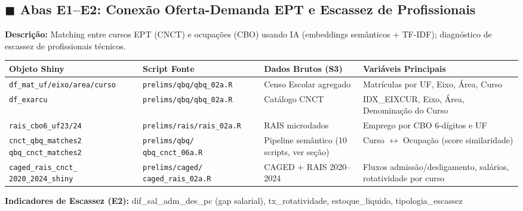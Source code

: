 \documentclass[10pt]{article}
\begin{document}
	\subsection*{\textcolor{tabE}{$\blacksquare$} Abas E1--E2: Conexão Oferta-Demanda EPT e Escassez de Profissionais}
	
	\noindent\textbf{Descrição:} Matching entre cursos EPT (CNCT) e ocupações (CBO) usando IA (embeddings semânticos + TF-IDF); diagnóstico de escassez de profissionais técnicos.
	
	\begin{center}
		\small
		\begin{tabular}{p{3.5cm}p{4.5cm}p{5cm}p{9cm}}
			\toprule
			\textbf{Objeto Shiny} & \textbf{Script Fonte} & \textbf{Dados Brutos (S3)} & \textbf{Variáveis Principais} \\
			\midrule
			\texttt{df\_mat\_uf/eixo/area/curso} & \texttt{prelims/qbq/qbq\_02a.R} & Censo Escolar agregado & Matrículas por UF, Eixo, Área, Curso \\
			\texttt{df\_exarcu} & \texttt{prelims/qbq/qbq\_02a.R} & Catálogo CNCT & IDX\_EIXCUR, Eixo, Área, Denominação do Curso \\
			\texttt{rais\_cbo6\_uf23/24} & \texttt{prelims/rais/rais\_02a.R} & RAIS microdados & Emprego por CBO 6-dígitos e UF \\
			\texttt{cnct\_qbq\_matches2} \newline \texttt{qbq\_cnct\_matches2} & \texttt{prelims/qbq/} \newline \texttt{qbq\_cnct\_06a.R} & Pipeline semântico \newline (10 scripts, ver seção) & Curso $\leftrightarrow$ Ocupação (score similaridade) \\
			\texttt{caged\_rais\_cnct\_} \newline \texttt{2020\_2024\_shiny} & \texttt{prelims/caged/} \newline \texttt{caged\_rais\_02a.R} & CAGED + RAIS 2020--2024 & Fluxos admissão/desligamento, salários, rotatividade por curso \\
			\bottomrule
		\end{tabular}
	\end{center}
	
	\noindent\textbf{Indicadores de Escassez (E2):} dif\_sal\_adm\_des\_pc (gap salarial), tx\_rotatividade, estoque\_liquido, tipologia\_escassez
	
\end{document}
